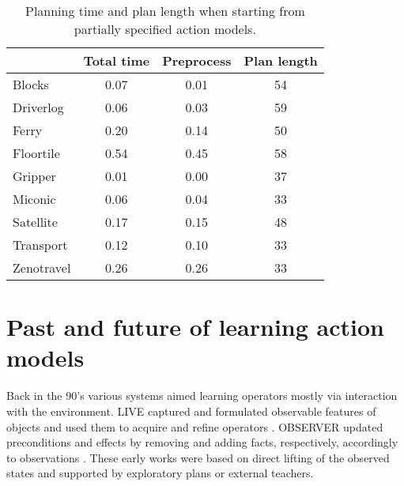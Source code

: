 \documentclass[letterpaper]{article} %
\newcommand{\strips}{\textsc{Strips}}     %
\begin{document}
\begin{table}
\begin{footnotesize}
	\begin{center}
		\begin{tabular}{l|c|c|c|}			
			 & Total time & Preprocess & Plan length  \\
			\hline
			Blocks & 0.07 & 0.01 & 54  \\
			Driverlog & 0.06 & 0.03 & 59 \\
			Ferry & 0.20 & 0.14 & 50 \\
			Floortile & 0.54 & 0.45 & 58 \\
			Gripper & 0.01 & 0.00 & 37 \\
			Miconic & 0.06 & 0.04 & 33  \\
			Satellite & 0.17 & 0.15 & 48 \\
			Transport & 0.12 & 0.10 & 33 \\
			Zenotravel & 0.26 & 0.26 & 33
		\end{tabular}
	\end{center}
        \end{footnotesize}
	\caption{\small Planning time and plan length when starting from partially specified action models.}
	\label{tab:time_plans_partial}	
\end{table}






\section{Past and future of learning action models}

Back in the 90's various systems aimed learning operators mostly via interaction with the environment. {\sc LIVE} captured and formulated observable features of objects and used them to acquire and refine operators \cite{ShenS89}. {\sc OBSERVER} updated preconditions and effects by removing and adding facts, respectively, accordingly to observations \cite{Wang95learningby}. These early works were based on direct lifting of the observed states and supported by exploratory plans or external teachers.%

\end{document}

